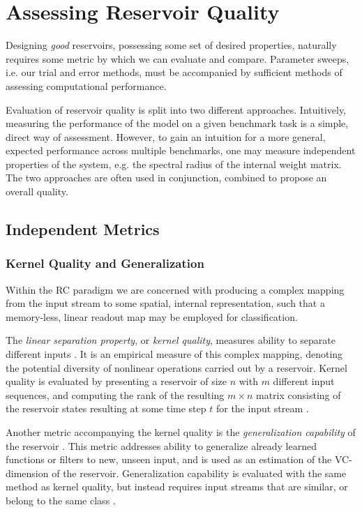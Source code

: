 \section{Assessing Reservoir Quality}

Designing \textit{good} reservoirs, possessing some set of desired properties,
naturally requires some metric by which we can evaluate and compare. Parameter
sweeps, i.e. our trial and error methods, must be accompanied by sufficient
methods of assessing computational performance.

Evaluation of reservoir quality is split into two different
approaches. Intuitively, measuring the performance of the model on a given
benchmark task is a simple, direct way of assessment. However, to gain an
intuition for a more general, expected performance across multiple benchmarks,
one may measure independent properties of the system, e.g. the spectral radius
of the internal weight matrix. The two approaches are often used in conjunction,
combined to propose an overall quality.

\subsection{Independent Metrics}

\subsubsection{Kernel Quality and Generalization}

Within the RC paradigm we are concerned with producing a complex mapping from
the input stream to some spatial, internal representation, such that a
memory-less, linear readout map may be employed for classification.

The \textit{linear separation property}, or \textit{kernel quality}, measures
ability to separate different inputs \cite{legenstein_edge_2007}. It is an
empirical measure of this complex mapping, denoting the potential diversity of
nonlinear operations carried out by a reservoir. Kernel quality is evaluated by
presenting a reservoir of size $n$ with $m$ different input sequences, and
computing the rank of the resulting $m\times n$ matrix consisting of the
reservoir states resulting at some time step $t$ for the input stream
\cite{busing_connectivity_2010}.

Another metric accompanying the kernel quality is the \textit{generalization
capability} of the reservoir \cite{legenstein_edge_2007}. This metric addresses
ability to generalize already learned functions or filters to new, unseen input,
and is used as an estimation of the VC-dimension of the
reservoir. Generalization capability is evaluated with the same method as kernel
quality, but instead requires input streams that are similar, or belong to the
same class \cite{busing_connectivity_2010}.

